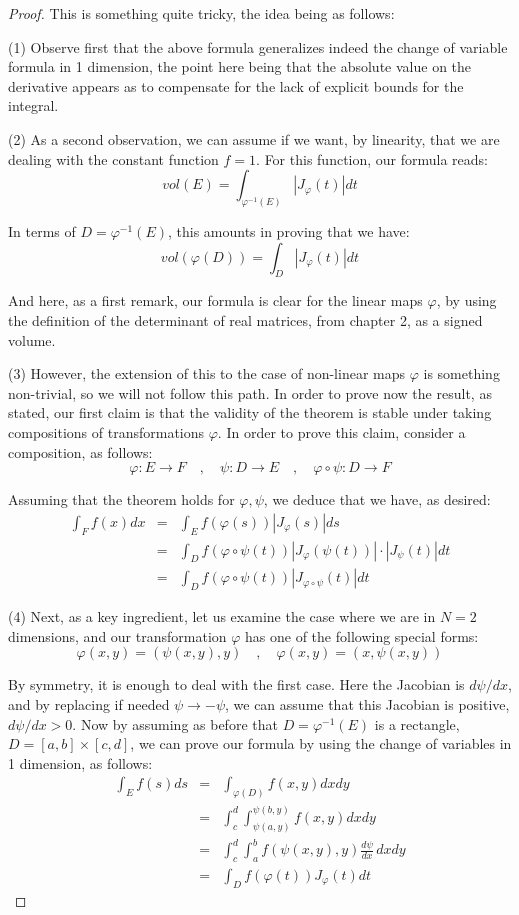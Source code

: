 \documentclass[12pt]{amsbook}
\begin{document}
\begin{proof}
This is something quite tricky, the idea being as follows:

\medskip

(1) Observe first that the above formula generalizes indeed the change of variable formula in 1 dimension, the point here being that the absolute value on the derivative appears as to compensate for the lack of explicit bounds for the integral.

\medskip 

(2) As a second observation, we can assume if we want, by linearity, that we are dealing with the constant function $f=1$. For this function, our formula reads:
$$vol(E)=\int_{\varphi^{-1}(E)}|J_\varphi(t)|dt$$

In terms of $D={\varphi^{-1}(E)}$, this amounts in proving that we have:
$$vol(\varphi(D))=\int_D|J_\varphi(t)|dt$$

And here, as a first remark, our formula is clear for the linear maps $\varphi$, by using the definition of the determinant of real matrices, from chapter 2, as a signed volume.

\medskip

(3) However, the extension of this to the case of non-linear maps $\varphi$ is something non-trivial, so we will not follow this path. In order to prove now the result, as stated, our first claim is that the validity of the theorem is stable under taking compositions of transformations $\varphi$. In order to prove this claim, consider a composition, as follows:
$$\varphi:E\to F\quad,\quad 
\psi:D\to E\quad,\quad 
\varphi\circ\psi:D\to F$$

Assuming that the theorem holds for $\varphi,\psi$, we deduce that we have, as desired:
\begin{eqnarray*}
\int_Ff(x)dx
&=&\int_Ef(\varphi(s))|J_\varphi(s)|ds\\
&=&\int_Df(\varphi\circ\psi(t))|J_\varphi(\psi(t))|\cdot|J_\psi(t)|dt\\
&=&\int_Df(\varphi\circ\psi(t))|J_{\varphi\circ\psi}(t)|dt
\end{eqnarray*}

(4) Next, as a key ingredient, let us examine the case where we are in $N=2$ dimensions, and our transformation $\varphi$ has one of the following special forms:
$$\varphi(x,y)=(\psi(x,y),y)\quad,\quad\varphi(x,y)=(x,\psi(x,y))$$

By symmetry, it is enough to deal with the first case. Here the Jacobian is $d\psi/dx$, and by replacing if needed $\psi\to-\psi$, we can assume that this Jacobian is positive, $d\psi/dx>0$. Now by assuming as before that $D=\varphi^{-1}(E)$ is a rectangle, $D=[a,b]\times[c,d]$, we can prove our formula by using the change of variables in 1 dimension, as follows:
\begin{eqnarray*}
\int_Ef(s)ds
&=&\int_{\varphi(D)}f(x,y)dxdy\\
&=&\int_c^d\int_{\psi(a,y)}^{\psi(b,y)}f(x,y)dxdy\\
&=&\int_c^d\int_a^bf(\psi(x,y),y)\frac{d\psi}{dx}\,dxdy\\
&=&\int_Df(\varphi(t))J_\varphi(t)dt
\end{eqnarray*}


\end{proof}
\end{document}
